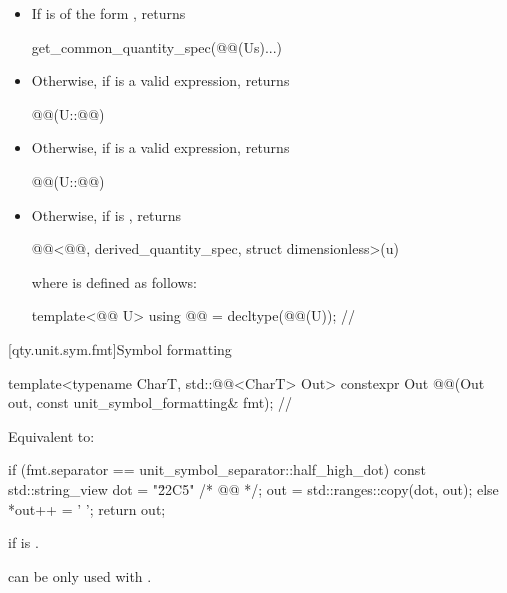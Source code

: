 \begin{itemdescr}
\pnum
\returns
\begin{itemize}
\item
If  is of the form ,
returns
\begin{codeblock}
get_common_quantity_spec(@@(Us{})...)
\end{codeblock}
\item
Otherwise, if  is a valid expression,
returns
\begin{codeblock}
@@(U::@@)
\end{codeblock}
\item
Otherwise, if  is a valid expression,
returns
\begin{codeblock}
@@(U::@@)
\end{codeblock}
\item
Otherwise, if
is ,
returns
\begin{codeblock}
@@<@@, derived_quantity_spec, struct dimensionless>(u)
\end{codeblock}
where  is defined as follows:
\begin{codeblock}
template<@@ U>
using @@ = decltype(@@(U{}));  // \expos
\end{codeblock}
\end{itemize}
\end{itemdescr}

[qty.unit.sym.fmt]{Symbol formatting}

\begin{itemdecl}
template<typename CharT, std::@@<CharT> Out>
constexpr Out @@(Out out, const unit_symbol_formatting& fmt);  // \expos
\end{itemdecl}

\begin{itemdescr}
\pnum
\effects
Equivalent to:
\begin{codeblock}
if (fmt.separator == unit_symbol_separator::half_high_dot) {
  const std::string_view dot = "\u22C5" /* @@ */;
  out = std::ranges::copy(dot, out);
} else {
  *out++ = ' ';
}
return out;
\end{codeblock}

\pnum
\throws
{} if
is .
\begin{note}
 can be only used with .
\end{note}
\end{itemdescr}

